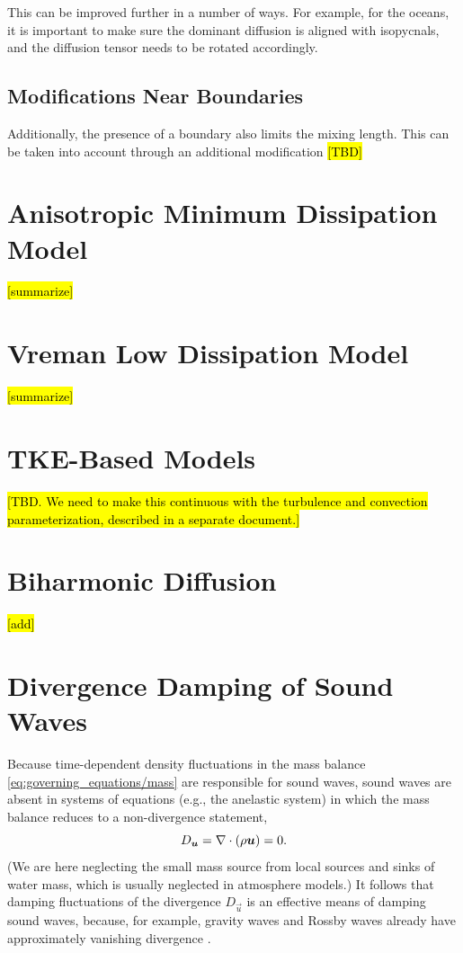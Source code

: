 \documentclass{report}
\begin{document}
This can be improved further in a number of ways. For example, for the oceans, it is important to make sure the dominant diffusion is aligned with isopycnals, and the diffusion tensor needs to be rotated accordingly. 

\subsection{Modifications Near Boundaries}
 
Additionally, the presence of a boundary also limits the mixing length. This can be taken into account through an additional modification \citep{Kleissl03a} \hl{[TBD]}

\section{Anisotropic Minimum Dissipation Model}

\hl{[summarize]}
\citep{Abkar17a}

\section{Vreman Low Dissipation Model}

\citep{vreman2004}

\hl{[summarize]}

\section{TKE-Based Models}

\citep{Deardorff80a}

\hl{[TBD. We need to make this continuous with the turbulence and convection parameterization, described in a separate document.]}


\section{Biharmonic Diffusion}

\hl{[add]} \citep{Jablonowksi11a}

\section{Divergence Damping of Sound Waves}

Because time-dependent density fluctuations in the mass balance \eqref{eq:governing_equations/mass} are responsible for sound waves, sound waves are absent in systems of equations (e.g., the anelastic system) in which the mass balance reduces to a non-divergence statement,
\[
D_{\boldsymbol{{u}}} = \nabla \cdot (\rho \boldsymbol{{u}}) = 0.
\]
(We are here neglecting the small mass source from local sources and sinks of water mass, which is usually neglected in atmosphere models.) It follows that damping fluctuations of the divergence $D_{\vec{u}}$ is an effective means of damping sound waves, because, for example, gravity waves and Rossby waves already have approximately vanishing divergence \citep{Skamarock92a}. 
\end{document}
